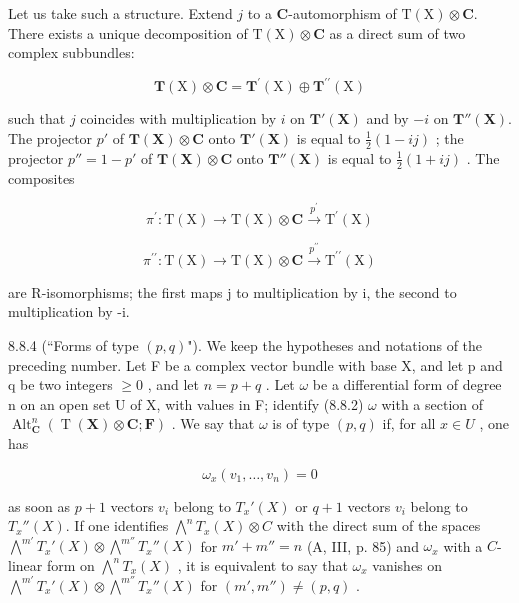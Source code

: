 Let us take such a structure. Extend \(j\) to a \(\mathbf{C}\)-automorphism of \(\mathrm{T}(\mathrm{X}) \otimes \mathbf{C}\). There exists a unique decomposition of \(\mathrm{T}(\mathrm{X}) \otimes \mathbf{C}\) as a direct sum of two complex subbundles:

\[
\mathbf {T} (\mathrm{X}) \otimes \mathbf {C} = \mathbf {T} ^ {\prime} (\mathrm{X}) \oplus \mathbf {T} ^ {\prime \prime} (\mathrm{X})\tag{1}
\]

such that \(j\) coincides with multiplication by \(i\) on \(\mathbf{T}'(\mathbf{X})\) and by \(-i\) on \(\mathbf{T}''(\mathbf{X})\). The projector \(p'\) of \(\mathbf{T}(\mathbf{X}) \otimes \mathbf{C}\) onto \(\mathbf{T}'(\mathbf{X})\) is equal to \(\frac{1}{2}(1 - ij)\) ; the projector \(p'' = 1 - p'\) of \(\mathbf{T}(\mathbf{X}) \otimes \mathbf{C}\) onto \(\mathbf{T}''(\mathbf{X})\) is equal to \(\frac{1}{2}(1 + ij)\) . The composites

\[
\pi^ {\prime} \colon \mathrm{T} (\mathrm{X}) \rightarrow \mathrm{T} (\mathrm{X}) \otimes \mathbf {C} \xrightarrow {p ^ {\prime}} \mathrm{T} ^ {\prime} (\mathrm{X})
\]

\[
\pi^ {\prime \prime}: \mathrm{T} (\mathrm{X}) \rightarrow \mathrm{T} (\mathrm{X}) \otimes \mathbf {C} \xrightarrow {p ^ {\prime \prime}} \mathrm{T} ^ {\prime \prime} (\mathrm{X})
\]

are R-isomorphisms; the first maps j to multiplication by i, the second to multiplication by -i.

8.8.4 (“Forms of type \((p,q)\)"). We keep the hypotheses and notations of the preceding number. Let F be a complex vector bundle with base X, and let p and q be two integers \(\geqslant0\) , and let \(n=p+q\) . Let \(\omega\) be a differential form of degree n on an open set U of X, with values in F; identify (8.8.2) \(\omega\) with a section of \(\operatorname{Alt}_{\mathbf{C}}^{n}(\operatorname{T}(\mathbf{X})\otimes\mathbf{C};\mathbf{F})\) . We say that \(\omega\) is of type \((p,q)\) if, for all \(x\in U\) , one has

\[
\omega_ {x} (v _ {1}, \dots , v _ {n}) = 0
\]

as soon as \(p + 1\) vectors \(v_i\) belong to \(T_x'(X)\) or \(q + 1\) vectors \(v_i\) belong to \(T_x''(X)\). If one identifies \(\bigwedge^n T_x(X) \otimes C\) with the direct sum of the spaces \(\bigwedge^{m'} T_x'(X) \otimes \bigwedge^{m''} T_x''(X)\) for \(m' + m'' = n\) (A, III, p. 85) and \(\omega_x\) with a \(C\)-linear form on \(\bigwedge^n T_x(X)\) , it is equivalent to say that \(\omega_x\) vanishes on \(\bigwedge^{m'} T_x'(X) \otimes \bigwedge^{m''} T_x''(X)\) for \((m', m'') \neq (p, q)\) .

